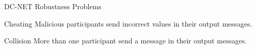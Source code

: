 \begin{frame}{DC-NET Robustness Problems}
    
    \begin{alertblock}{Cheating}
        Malicious participants send incorrect values in their output messages.
    \end{alertblock}
    
    \begin{alertblock}{Collision}
        More than one participant send a message in their output messages.
    \end{alertblock}
    
\end{frame}
